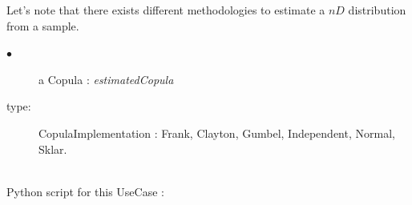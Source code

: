 Let's note that there exists different methodologies to estimate a $nD$ distribution from a sample.


{
  \begin{description}
  \item[$\bullet$] a Copula : {\itshape estimatedCopula}
  \item[type:] CopulaImplementation : Frank, Clayton, Gumbel, Independent, Normal, Sklar.
  \end{description}
}

\textspace\\
Python script for this UseCase :

